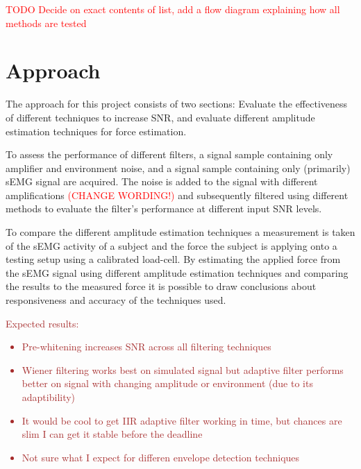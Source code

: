\textcolor{red}{TODO Decide on exact contents of list, add a flow diagram explaining how all methods are tested}

\section{Approach}
The approach for this project consists of two sections: Evaluate the effectiveness of different techniques to increase SNR, and evaluate different amplitude estimation techniques for force estimation.

To assess the performance of different filters, a signal sample containing only amplifier and environment noise, and a signal sample containing only (primarily) sEMG signal are acquired. The noise is added to the signal with different amplifications \textcolor{red}{(CHANGE WORDING!)} and subsequently filtered using different methods to evaluate the filter's performance at different input SNR levels.

To compare the different amplitude estimation techniques a measurement is taken of the sEMG activity of a subject and the force the subject is applying onto a testing setup using a calibrated load-cell. By estimating the applied force from the sEMG signal using different amplitude estimation techniques and comparing the results to the measured force it is possible to draw conclusions about responsiveness and accuracy of the techniques used.



\textcolor{brown}{
Expected results:
\begin{itemize}
    \item Pre-whitening increases SNR across all filtering techniques
    \item Wiener filtering works best on simulated signal but adaptive filter performs better on signal with changing amplitude or environment (due to its adaptibility)
    \item It would be cool to get IIR adaptive filter working in time, but chances are slim I can get it stable before the deadline
    \item Not sure what I expect for differen envelope detection techniques
\end{itemize}
}